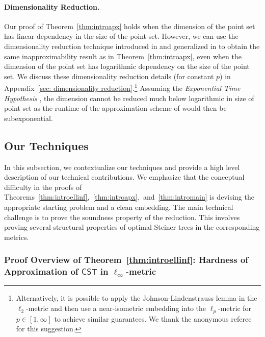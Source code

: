 \documentclass{article}\providecommand{\DeclareRedundantLanguages}[2]{}\usepackage[a4paper,margin=20mm]{geometry}
\newcommand{\1}{\textbf{1}}
\newcommand{\cst}{$\mathsf{CST}$\xspace}
\begin{document}
 \paragraph{Dimensionality Reduction.}
Our proof of Theorem~\ref{thm:introapx} holds when the dimension of the point set has linear dependency in the size of the point set. However, we can use the dimensionality reduction technique introduced in \cite{CK19} and generalized in \cite{CKL22} to obtain the same inapproximability result as in Theorem~\ref{thm:introapx}, even when the dimension of the point set has logarithmic dependency on the size of the point set. We discuss these dimensionality reduction details (for constant $p$) in Appendix~\ref{sec: dimensionality reduction}.\footnote{Alternatively, it is possible to apply the Johnson-Lindenstrauss lemma \cite{Johnson_Lindenstrauss_1984} in the $\ell_2$-metric and then use a near-isometric embedding into the $\ell_p$-metric for $p \in [1,\infty]$ to achieve similar guarantees. We thank the anonymous referee for this suggestion.}
Assuming the \emph{Exponential Time Hypothesis} \cite{IP01,IPZ01}, the dimension cannot be reduced much below logarithmic in size of point set as the runtime of the approximation scheme of \cite{Arora_1998,Mitchell99,RaoS98} would then be subexponential. 






 
  
 \subsection{Our Techniques}\label{sec:techniques}


In this subsection, we contextualize our techniques and provide a high level description of our technical contributions. We emphasize that the conceptual difficulty in the proofs of Theorems~\ref{thm:introellinf},~\ref{thm:introapx},~and~\ref{thm:intromain} is devising the appropriate starting problem and a clean embedding. The main technical challenge is to prove the soundness property of the reduction. This involves proving several structural properties of optimal Steiner trees in the corresponding metrics.



\subsubsection{\texorpdfstring{Proof Overview of Theorem~\ref{thm:introellinf}: Hardness of Approximation of \cst in $\ell_{\infty}$-metric}{Proof Overview of Theorem~\ref{thm:introellinf}: Hardness of Approximation of CST in linf-metric}}
\end{document}
